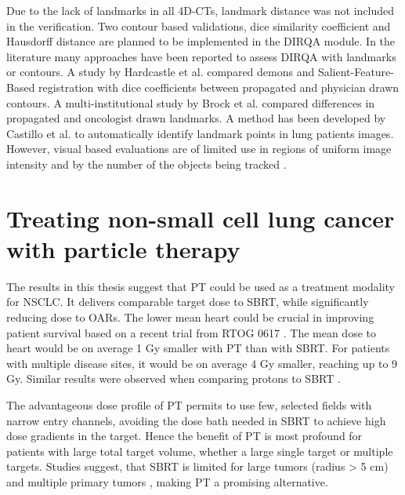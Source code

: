 
Due to the lack of landmarks in all 4D-CTs, landmark distance was not included in the verification. Two contour based validations, dice similarity coefficient \cite{Varadhan2013} and Hausdorff distance \cite{Huttenlocher1993}
are planned to be implemented in the DIRQA module. In the literature many approaches have been reported to assess DIRQA with landmarks or contours. 
A study by Hardcastle et al. \cite{Hardcastle2012} 
compared demons and Salient-Feature-Based registration with dice coefficients between propagated and physician drawn contours.
A multi-institutional study by Brock et al. \cite{Brock2010} compared differences in propagated and oncologist drawn landmarks. 
A method has been developed by Castillo et al. \cite{Castillo2009} to automatically identify landmark points
in lung patients images. However, visual based evaluations are of limited use in regions of uniform image intensity and by the number of the objects being tracked \cite{Kashani2008, Liu2012}.



\newpage
\section{Treating non-small cell lung cancer with particle therapy}

The results in this thesis suggest that PT could be used as a treatment modality for NSCLC. It delivers comparable target dose to SBRT, while significantly reducing 
dose to OARs. The lower mean heart could be crucial in improving patient survival based on a recent trial from RTOG 0617 \cite{Bradley2015}. 
The mean dose to heart would be on average 1 Gy smaller with PT than with SBRT. 
For patients with multiple disease sites, it would be on average 4 Gy smaller, reaching up to 9 Gy. Similar results were observed when comparing protons to SBRT \cite{Georg2008}. 

The advantageous dose profile of PT permits to use few, selected fields with narrow entry channels, avoiding the dose bath needed in SBRT
to achieve high dose gradients in the target.
Hence the benefit of PT is most profound for patients with large total target volume, whether a large single target or multiple targets. Studies suggest, that SBRT is limited for large
tumors (radius > 5 cm) and multiple primary tumors \cite{Timmerman2006, Georg2008, Westover2012}, making PT a promising alternative.


